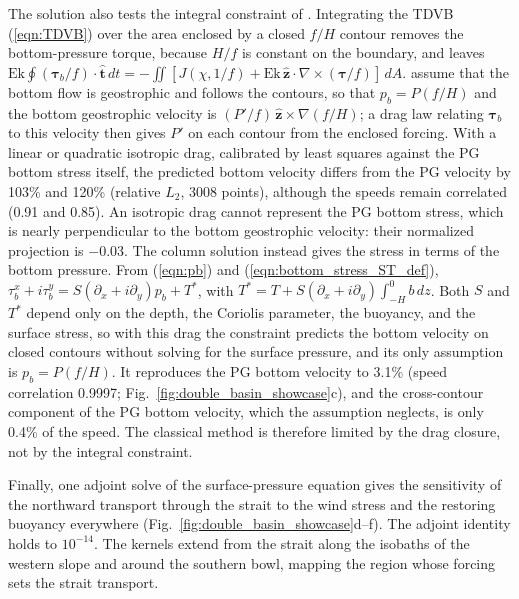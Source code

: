 \documentclass{ametsocV6.2}
\begin{document}
The solution also tests the integral constraint of \citet{nost&isachsen03}.
Integrating the TDVB (\ref{eqn:TDVB}) over the area enclosed by a closed $f/H$ contour removes the bottom-pressure torque, because $H/f$ is constant on the boundary, and leaves
$\mathrm{Ek} \oint (\boldsymbol{\tau}_b / f) \cdot \hat{\mathbf{t}} \, dt = - \iint [ J(\chi, 1/f) + \mathrm{Ek} \, \hat{\mathbf{z}} \cdot \nabla \times (\boldsymbol{\tau}/f) ] \, dA$.
\citet{nost&isachsen03} assume that the bottom flow is geostrophic and follows the contours, so that $p_b = P(f/H)$ and the bottom geostrophic velocity is $(P'/f) \, \hat{\mathbf{z}} \times \nabla (f/H)$; a drag law relating $\boldsymbol{\tau}_b$ to this velocity then gives $P'$ on each contour from the enclosed forcing.
With a linear or quadratic isotropic drag, calibrated by least squares against the PG bottom stress itself, the predicted bottom velocity differs from the PG velocity by 103\% and 120\% (relative $L_2$, 3008 points), although the speeds remain correlated (0.91 and 0.85).
An isotropic drag cannot represent the PG bottom stress, which is nearly perpendicular to the bottom geostrophic velocity: their normalized projection is $-0.03$.
The column solution instead gives the stress in terms of the bottom pressure.
From (\ref{eqn:pb}) and (\ref{eqn:bottom_stress_ST_def}), $\tau_b^x + i \tau_b^y = S (\partial_x + i \partial_y) p_b + T^*$, with $T^* = T + S (\partial_x + i \partial_y) \int_{-H}^{0} b \, dz$.
Both $S$ and $T^*$ depend only on the depth, the Coriolis parameter, the buoyancy, and the surface stress, so with this drag the constraint predicts the bottom velocity on closed contours without solving for the surface pressure, and its only assumption is $p_b = P(f/H)$.
It reproduces the PG bottom velocity to 3.1\% (speed correlation 0.9997; Fig.~\ref{fig:double_basin_showcase}c), and the cross-contour component of the PG bottom velocity, which the assumption neglects, is only 0.4\% of the speed.
The classical method is therefore limited by the drag closure, not by the integral constraint.

Finally, one adjoint solve of the surface-pressure equation gives the sensitivity of the northward transport through the strait to the wind stress and the restoring buoyancy everywhere (Fig.~\ref{fig:double_basin_showcase}d--f).
The adjoint identity holds to $10^{-14}$.
The kernels extend from the strait along the isobaths of the western slope and around the southern bowl, mapping the region whose forcing sets the strait transport.
\end{document}
